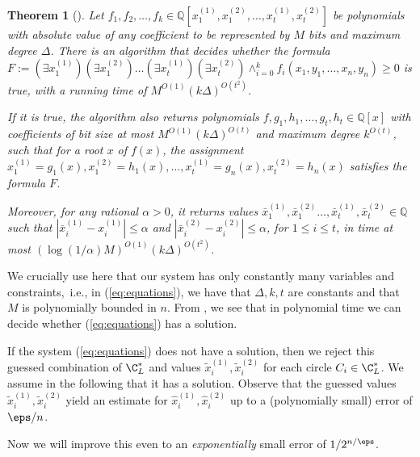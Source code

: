 \documentclass[10pt,a4paper]{article}
\newtheorem{theorem}{Theorem}[section]
\theoremstyle{plain}
\theoremstyle{plain}
\theoremstyle{plain}
\theoremstyle{definition}
\begin{document}
{\begin{theorem}[\cite{GrigorevVV88}]
	\label{thm:GrigorevVV88}
	Let $f_1, f_2, \dots, f_k \in \mathbb{Q}[x_{1}^{(1)},x_{1}^{(2)}, \dots, x_{t}^{(1)},x_{t}^{(2)}]$ be polynomials with absolute value of any coefficient to be represented by $M$ bits and maximum degree $\Delta$.
	There is an algorithm that decides whether the formula $F:= (\exists x_{1}^{(1)})(\exists x_{1}^{(2)}) \dots (\exists x_{t}^{(1)}) (\exists x_{t}^{(2)}) \land_{i=0}^{k} f_i(x_1, y_1, \dots, x_n, y_n) \geqslant 0$ is true, with a running time of $M^{O(1)}(k\Delta)^{O(t^2)}$.
	
	If it is true, the algorithm also returns polynomials $f, g_1, h_1, \dots, g_t, h_t \in \mathbb{Q}[x]$ with coefficients of bit size at most $M^{O(1)} (k \Delta)^{O(t)}$ and maximum degree $k^{O(t)}$, such that for a root $x$ of $f(x)$, the assignment $x_{1}^{(1)}=g_1(x), x_{1}^{(2)}=h_1(x), \dots, x_{t}^{(1)}=g_n(x), x_{t}^{(2)}=h_n(x)$
	satisfies the
	formula $F$.
	
	Moreover, for any rational $\alpha>0$, it returns values $\bar{x}_{1}^{(1)},\bar{x}_{1}^{(2)} \dots, \bar{x}_{t}^{(1)},\bar{x}_{t}^{(2)} \in \mathbb{Q}$ such that $| \bar{x}_{i}^{(1)}- {x}_{i}^{(1)} | \leqslant \alpha$ and  $| \bar{x}_{i}^{(2)}- {x}_{i}^{(2)} | \leqslant \alpha$, for $1 \leqslant i \leqslant t$, in time at most $(\log (1/\alpha) M)^{O(1)} (k \Delta)^{O(t^2)}$.
\end{theorem}




We crucially use here that our system has only constantly many variables
and constraints,~i.e., in (\ref{eq:equations}), we have that $\Delta, k, t$ are constants and that $M$ is polynomially bounded in $n$.
From , we see that
in polynomial time we can decide whether
(\ref{eq:equations}) has a solution.

If the system (\ref{eq:equations}) does
not have a solution, then we reject this guessed combination of $\C_{L}^{*}$
and values $\tilde{x}_{i}^{(1)},\tilde{x}_{i}^{(2)}$ for each circle
$C_{i}\in\C_{L}^{*}$. We assume in the following that it has a solution.
Observe that the guessed values $\tilde{x}_{i}^{(1)},\tilde{x}_{i}^{(2)}$
yield an estimate for $\hat{x}_{i}^{(1)},\hat{x}_{i}^{(2)}$ up to
a (polynomially small) error of $\eps/n$.

Now we will improve this even to an \emph{exponentially} small error of $1/2^{n/\eps}$.


}
\end{document}
